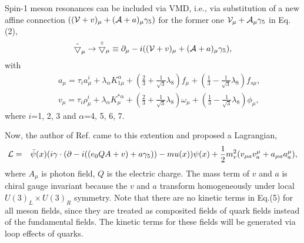 Spin-1 meson resonances can be included via VMD, i.e., via substitution of
a new affine connection $(({\cal V}+v)_\mu+({\cal A}+a)_\mu \gamma_5)$ 
for the former one  ${\cal V}_\mu+{\cal A}_\mu \gamma_5$ in Eq.(2),
\begin{eqnarray}
\tilde{\bigtriangledown}_\mu \rightarrow \tilde{\tilde{\bigtriangledown}}_\mu\equiv \partial_\mu -
i(({\cal V}+v)_\mu+({\cal A}+a)_\mu \gamma_5),
\end{eqnarray}
with
\begin{eqnarray}
& &a_{\mu}=\tau_{i}a^{i}_{\mu}+\lambda_\alpha K^\alpha_{1\mu}+(\frac{2}{3}
+\frac{1}{\sqrt{3}}  
\lambda_8)f_{\mu}+(\frac{1}{3}-\frac{1}{\sqrt{3}}
\lambda_8)f_{s\mu},\nonumber\\
& &v_{\mu}=\tau_{i}\rho^{i}_{\mu}+\lambda_\alpha
K_{\mu}^{*\alpha}+(\frac{2}{3}+
\frac{1}{\sqrt{3}}\lambda_8)\omega_{\mu}+(\frac{1}{3}-
\frac{1}{\sqrt{3}}\lambda_8)\phi_{\mu},
\end{eqnarray}
where $i$=1, 2, 3 and $\alpha$=4, 5, 6, 7.

Now, the author of Ref.\cite{Li1} came to this extention and proposed a
Lagrangian,
\begin{eqnarray}
{\cal L}&=&\bar{\psi}(x)(i\gamma\cdot(\partial-i((
e_0Q A+v)+a\gamma_{5}))-mu(x))\psi(x) 
+{1\over 2}m_v^2 (v_{\mu a}v^\mu_a + a_{\mu a} a^\mu_a),
\end{eqnarray}
where $A_\mu$ is photon field, $Q$ is the
electric charge. The mass term of $v$ and 
$a$ is chiral gauge invariant because the $v$ and $a$ transform
homogeneously under local $U(3)_L\times U(3)_R$ symmetry. 
Note that there are no kinetic terms in Eq.(5) for all meson fields,
since they are treated as composited fields of quark fields instead of the
fundamental fields. The kinetic terms for these fields will be generated
via loop effects of quarks.

